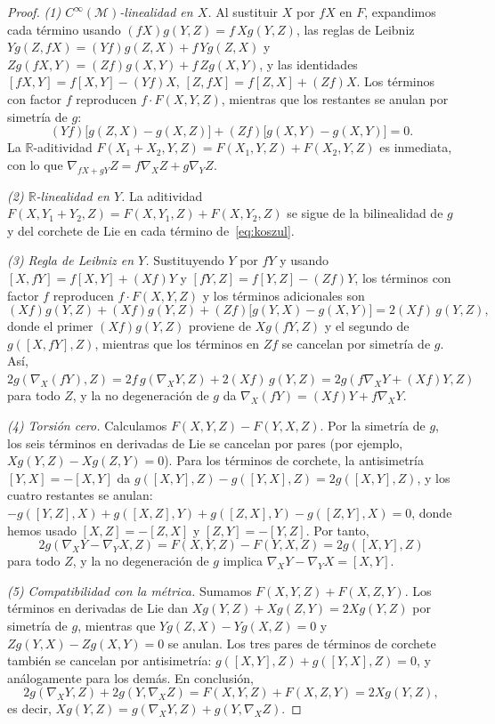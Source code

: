\begin{proof}
\textit{(1) $C^\infty(\mathcal{M})$-linealidad en $X$.} Al sustituir $X$ por $fX$ en $F$, expandimos cada término usando $(fX)g(Y,Z) = f\,Xg(Y,Z)$, las reglas de Leibniz $Yg(Z,fX) = (Yf)g(Z,X) + f\,Yg(Z,X)$ y $Zg(fX,Y) = (Zf)g(X,Y) + f\,Zg(X,Y)$, y las identidades $[fX,Y] = f[X,Y] - (Yf)X$, $[Z,fX] = f[Z,X] + (Zf)X$. Los términos con factor $f$ reproducen $f \cdot F(X,Y,Z)$, mientras que los restantes se anulan por simetría de $g$:
\[
(Yf)\bigl[g(Z,X) - g(X,Z)\bigr] + (Zf)\bigl[g(X,Y) - g(X,Y)\bigr] = 0.
\]
La $\mathbb{R}$-aditividad $F(X_1+X_2,Y,Z) = F(X_1,Y,Z) + F(X_2,Y,Z)$ es inmediata, con lo que $\nabla_{fX+gY}Z = f\nabla_X Z + g\nabla_Y Z$.

\textit{(2) $\mathbb{R}$-linealidad en $Y$.} La aditividad $F(X, Y_1+Y_2, Z) = F(X,Y_1,Z) + F(X,Y_2,Z)$ se sigue de la bilinealidad de $g$ y del corchete de Lie en cada término de~\eqref{eq:koszul}.

\textit{(3) Regla de Leibniz en $Y$.} Sustituyendo $Y$ por $fY$ y usando $[X,fY] = f[X,Y] + (Xf)Y$ y $[fY,Z] = f[Y,Z] - (Zf)Y$, los términos con factor $f$ reproducen $f \cdot F(X,Y,Z)$ y los términos adicionales son
\[
(Xf)g(Y,Z) + (Xf)g(Y,Z) + (Zf)\bigl[g(Y,X) - g(X,Y)\bigr] = 2(Xf)\,g(Y,Z),
\]
donde el primer $(Xf)g(Y,Z)$ proviene de $Xg(fY,Z)$ y el segundo de $g([X,fY],Z)$, mientras que los términos en $Zf$ se cancelan por simetría de $g$. Así, $2g(\nabla_X(fY),Z) = 2f\,g(\nabla_X Y, Z) + 2(Xf)\,g(Y,Z) = 2g(f\nabla_X Y + (Xf)Y, Z)$ para todo $Z$, y la no degeneración de $g$ da $\nabla_X(fY) = (Xf)Y + f\nabla_X Y$.

\textit{(4) Torsión cero.} Calculamos $F(X,Y,Z) - F(Y,X,Z)$. Por la simetría de $g$, los seis términos en derivadas de Lie se cancelan por pares (por ejemplo, $Xg(Y,Z) - Xg(Z,Y) = 0$). Para los términos de corchete, la antisimetría $[Y,X] = -[X,Y]$ da $g([X,Y],Z) - g([Y,X],Z) = 2g([X,Y],Z)$, y los cuatro restantes se anulan: $-g([Y,Z],X) + g([X,Z],Y) + g([Z,X],Y) - g([Z,Y],X) = 0$, donde hemos usado $[X,Z] = -[Z,X]$ y $[Z,Y] = -[Y,Z]$. Por tanto,
\[
2g(\nabla_X Y - \nabla_Y X, Z) = F(X,Y,Z) - F(Y,X,Z) = 2g([X,Y], Z)
\]
para todo $Z$, y la no degeneración de $g$ implica $\nabla_X Y - \nabla_Y X = [X,Y]$.

\textit{(5) Compatibilidad con la métrica.} Sumamos $F(X,Y,Z) + F(X,Z,Y)$. Los términos en derivadas de Lie dan $Xg(Y,Z) + Xg(Z,Y) = 2Xg(Y,Z)$ por simetría de $g$, mientras que $Yg(Z,X) - Yg(X,Z) = 0$ y $Zg(Y,X) - Zg(X,Y) = 0$ se anulan. Los tres pares de términos de corchete también se cancelan por antisimetría: $g([X,Y],Z) + g([Y,X],Z) = 0$, y análogamente para los demás. En conclusión,
\[
2g(\nabla_X Y, Z) + 2g(Y, \nabla_X Z) = F(X,Y,Z) + F(X,Z,Y) = 2Xg(Y,Z),
\]
es decir, $Xg(Y,Z) = g(\nabla_X Y, Z) + g(Y, \nabla_X Z)$.
\end{proof}

